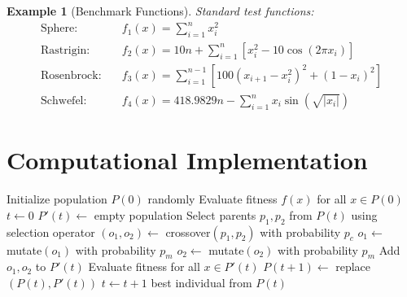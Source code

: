 \documentclass[a4paper, 11pt]{article}
\newtheorem{example}{Example}[section]
\begin{document}
\begin{example}[Benchmark Functions]
Standard test functions:
\begin{align}
\text{Sphere:} \quad & f_1(x) = \sum_{i=1}^n x_i^2 \\
\text{Rastrigin:} \quad & f_2(x) = 10n + \sum_{i=1}^n \left[x_i^2 - 10\cos(2\pi x_i)\right] \\
\text{Rosenbrock:} \quad & f_3(x) = \sum_{i=1}^{n-1} \left[100(x_{i+1} - x_i^2)^2 + (1-x_i)^2\right] \\
\text{Schwefel:} \quad & f_4(x) = 418.9829n - \sum_{i=1}^n x_i \sin(\sqrt{|x_i|})
\end{align}
\end{example}

\section{Computational Implementation}

\begin{algorithm}
\caption{Genetic Algorithm}
\begin{algorithmic}[1]
\State Initialize population $P(0)$ randomly
\State Evaluate fitness $f(x)$ for all $x \in P(0)$
\State $t \gets 0$
    \State $P'(t) \gets$ empty population
        \State Select parents $p_1, p_2$ from $P(t)$ using selection operator
        \State $(o_1, o_2) \gets$ crossover$(p_1, p_2)$ with probability $p_c$
        \State $o_1 \gets$ mutate$(o_1)$ with probability $p_m$
        \State $o_2 \gets$ mutate$(o_2)$ with probability $p_m$
        \State Add $o_1, o_2$ to $P'(t)$
    \EndWhile
    \State Evaluate fitness for all $x \in P'(t)$
    \State $P(t+1) \gets$ replace$(P(t), P'(t))$
    \State $t \gets t + 1$
\EndWhile
\State \Return best individual from $P(t)$
\end{algorithmic}
\end{algorithm}
\end{document}
